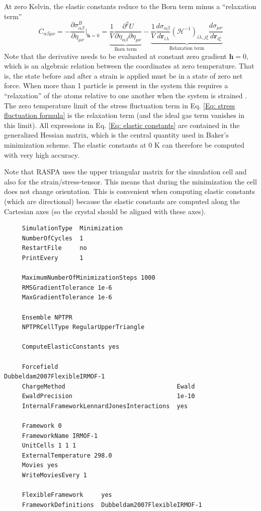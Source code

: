 At zero Kelvin, the elastic constants reduce to the Born term minus a ``relaxation term'' \cite{Lutsko1989}
\begin{equation}
C_{\alpha\beta\mu\nu}=
        -\frac{\partial\sigma_{\alpha\beta}^B}{\partial\eta_{\mu\nu}}\Bigg|_{\mathbf{h}=0}=
          \underbrace{\frac{1}{V}\frac{\partial^2 U}{\partial\eta_{\alpha\beta}\partial\eta_{\mu\nu}}}_{\text{Born term}}
        -\underbrace{\frac{1}{V}\frac{d\sigma_{\alpha\beta}}{d\mathbf{r}_{i\lambda}}\left({\mathcal H}^{-1}\right)_{i\lambda,j\xi}
         \frac{d\sigma_{\mu\nu}}{d\mathbf{r}_{i\xi}}}_{\text{Relaxation term}}
  \label{Eq: elastic constants}
\end{equation}
Note that the derivative needs to be evaluated at constant zero gradient $\mathbf{h}=0$, which is an algebraic relation between the coordinates
at zero temperature. That is, the state before and after a strain is applied must be in a state of zero net force.
When more than 1 particle is present in the system this requires a ``relaxation'' of the atoms relative to one
another when the system is strained \cite{Lutsko1989}.
The zero temperature limit of the stress fluctuation term in Eq. \ref{Eq: stress fluctuation formula}
is the relaxation term (and the ideal gas term vanishes in this limit).
All expressions in Eq. \ref{Eq: elastic constants} are contained in the generalized Hessian matrix, which
is the central quantity used in Baker's minimization scheme.
The elastic constants at 0 K can therefore be computed with very high accuracy.

Note that RASPA uses the upper triangular matrix for the simulation cell and
also for the strain/stress-tensor.
This means that during the minimization the cell does not change orientation. This is convenient when computing elastic constants (which are directional)
because the elastic constants are computed along the Cartesian axes (so the crystal should be aligned with these axes).

\begin{tiny}
\begin{verbatim}
     SimulationType  Minimization
     NumberOfCycles  1
     RestartFile     no
     PrintEvery      1
     
     MaximumNumberOfMinimizationSteps 1000
     RMSGradientTolerance 1e-6
     MaxGradientTolerance 1e-6
     
     Ensemble NPTPR
     NPTPRCellType RegularUpperTriangle
     
     ComputeElasticConstants yes
     
     Forcefield                                 Dubbeldam2007FlexibleIRMOF-1
     ChargeMethod                               Ewald
     EwaldPrecision                             1e-10
     InternalFrameworkLennardJonesInteractions  yes
     
     Framework 0
     FrameworkName IRMOF-1
     UnitCells 1 1 1
     ExternalTemperature 298.0
     Movies yes
     WriteMoviesEvery 1
     
     FlexibleFramework     yes
     FrameworkDefinitions  Dubbeldam2007FlexibleIRMOF-1
\end{verbatim}
\end{tiny}

